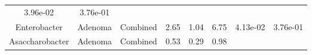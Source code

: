 \documentclass[12pt,]{article}
\begin{document}
\begin{longtable}[]{@{}cccccccc@{}}
\begin{minipage}[t]{0.06\columnwidth}
3.96e-02\strut
\end{minipage} & \begin{minipage}[t]{0.06\columnwidth}\centering\strut
3.76e-01\strut
\end{minipage}\tabularnewline
\begin{minipage}[t]{0.19\columnwidth}\centering\strut
Enterobacter\strut
\end{minipage} & \begin{minipage}[t]{0.07\columnwidth}\centering\strut
Adenoma\strut
\end{minipage} & \begin{minipage}[t]{0.09\columnwidth}\centering\strut
Combined\strut
\end{minipage} & \begin{minipage}[t]{0.03\columnwidth}\centering\strut
2.65\strut
\end{minipage} & \begin{minipage}[t]{0.14\columnwidth}\centering\strut
1.04\strut
\end{minipage} & \begin{minipage}[t]{0.14\columnwidth}\centering\strut
6.75\strut
\end{minipage} & \begin{minipage}[t]{0.06\columnwidth}\centering\strut
4.13e-02\strut
\end{minipage} & \begin{minipage}[t]{0.06\columnwidth}\centering\strut
3.76e-01\strut
\end{minipage}\tabularnewline
\begin{minipage}[t]{0.19\columnwidth}\centering\strut
Asaccharobacter\strut
\end{minipage} & \begin{minipage}[t]{0.07\columnwidth}\centering\strut
Adenoma\strut
\end{minipage} & \begin{minipage}[t]{0.09\columnwidth}\centering\strut
Combined\strut
\end{minipage} & \begin{minipage}[t]{0.03\columnwidth}\centering\strut
0.53\strut
\end{minipage} & \begin{minipage}[t]{0.14\columnwidth}\centering\strut
0.29\strut
\end{minipage} & \begin{minipage}[t]{0.14\columnwidth}\centering\strut
0.98\strut
\end{minipage} & \begin{minipage}[t]{0.06\columnwidth}\centering\strut

\end{minipage}
\end{longtable}
\end{document}
